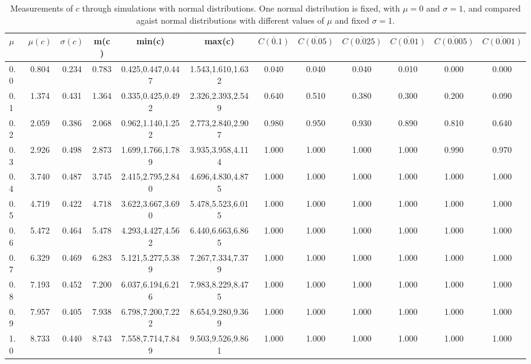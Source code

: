 \begin{table*}[h!]
\begin{center}
\begin{tabular}{| l | c | c | c | c | c | c | c | c | c | c | c |}\hline
$\mu$ & $\mu(c)$ & $\sigma(c)$ & m(c) & min(c) & max(c) & $\overline{C(0.1)}$ & $\overline{C(0.05)}$ & $\overline{C(0.025)}$ & $\overline{C(0.01)}$ & $\overline{C(0.005)}$ & $\overline{C(0.001)}$ \\\hline
0.0 & 0.804 & 0.234 & 0.783 & 0.425,0.447,0.447 & 1.543,1.610,1.632  & 0.040  & 0.040  & 0.040  & 0.010  & 0.000  & 0.000 \\\hline
0.1 & 1.374 & 0.431 & 1.364 & 0.335,0.425,0.492 & 2.326,2.393,2.549  & 0.640  & 0.510  & 0.380  & 0.300  & 0.200  & 0.090 \\\hline
0.2 & 2.059 & 0.386 & 2.068 & 0.962,1.140,1.252 & 2.773,2.840,2.907  & 0.980  & 0.950  & 0.930  & 0.890  & 0.810  & 0.640 \\\hline
0.3 & 2.926 & 0.498 & 2.873 & 1.699,1.766,1.789 & 3.935,3.958,4.114  & 1.000  & 1.000  & 1.000  & 1.000  & 0.990  & 0.970 \\\hline
0.4 & 3.740 & 0.487 & 3.745 & 2.415,2.795,2.840 & 4.696,4.830,4.875  & 1.000  & 1.000  & 1.000  & 1.000  & 1.000  & 1.000 \\\hline
0.5 & 4.719 & 0.422 & 4.718 & 3.622,3.667,3.690 & 5.478,5.523,6.015  & 1.000  & 1.000  & 1.000  & 1.000  & 1.000  & 1.000 \\\hline
0.6 & 5.472 & 0.464 & 5.478 & 4.293,4.427,4.562 & 6.440,6.663,6.865  & 1.000  & 1.000  & 1.000  & 1.000  & 1.000  & 1.000 \\\hline
0.7 & 6.329 & 0.469 & 6.283 & 5.121,5.277,5.389 & 7.267,7.334,7.379  & 1.000  & 1.000  & 1.000  & 1.000  & 1.000  & 1.000 \\\hline
0.8 & 7.193 & 0.452 & 7.200 & 6.037,6.194,6.216 & 7.983,8.229,8.475  & 1.000  & 1.000  & 1.000  & 1.000  & 1.000  & 1.000 \\\hline
0.9 & 7.957 & 0.405 & 7.938 & 6.798,7.200,7.222 & 8.654,9.280,9.369  & 1.000  & 1.000  & 1.000  & 1.000  & 1.000  & 1.000 \\\hline
1.0 & 8.733 & 0.440 & 8.743 & 7.558,7.714,7.849 & 9.503,9.526,9.861  & 1.000  & 1.000  & 1.000  & 1.000  & 1.000  & 1.000 \\\hline
\end{tabular}
\caption{Measurements of $c$ through simulations
with normal distributions.
One normal distribution is fixed, with $\mu=0$ and $\sigma=1$,
and compared agaist normal distributions with different values of $\mu$ and fixed $\sigma=1$.}
\end{center}
\end{table*}